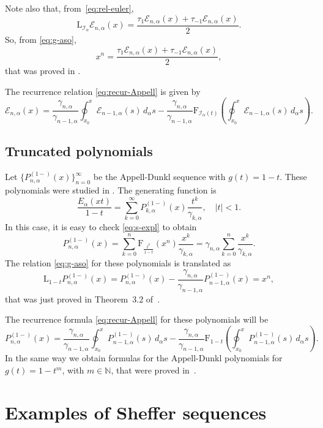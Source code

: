 \documentclass[11pt]{article}
\theoremstyle{plain}
\theoremstyle{remark}
\newtheorem{example}[theorem]{Example}
\numberwithin{equation}{section} %
\newcommand{\Ea}{E_{\alpha}}
\newcommand{\I}{\mathcal{I}}
\newcommand{\E}{\mathcal{E}}
\newcommand{\NN}{\mathbb{N}}
\newcommand{\FF}{\mathrm{F}}
\newcommand{\LL}{\mathrm{L}}
\begin{document}
Note also that, from~\eqref{eq:rel-euler},
\[
\LL_{\I_{\alpha}}\E_{n,\alpha}(x) = \frac{\tau_1\E_{n,\alpha}(x)+\tau_{-1}\E_{n,\alpha}(x)}{2}.
\]
So, from \eqref{eq:g-aso},
\[
x^n = \frac{\tau_1\E_{n,\alpha}(x)+\tau_{-1}\E_{n,\alpha}(x)}{2},
\]
that was proved in \cite{CMV}.

The recurrence relation \eqref{eq:recur-Appell} is given by
\[
\E_{n,\alpha}(x) = \frac{\gamma_{n,\alpha}}{\gamma_{n-1,\alpha}}
\oint_{x_0}^x \E_{n-1,\alpha}(s)\,d_{\alpha}s 
- \frac{\gamma_{n,\alpha}}{\gamma_{n-1,\alpha}} 
\FF_{\I_{\alpha}(t)} \left(\oint_{x_0}^x\E_{n-1,\alpha}(s)\,d_{\alpha}s\right).
\]

\subsection{Truncated polynomials}

Let $\{P_{n,\alpha}^{(1-)}(x)\}_{n=0}^{\infty}$ be the Appell-Dunkl sequence with $g(t) = 1-t$. These polynomials were studied in \cite{JMC}. The generating function is
\[
\frac{\Ea(xt)}{1-t} = \sum_{k=0}^{\infty}P_{k,\alpha}^{(1-)}(x)\frac{t^k}{\gamma_{k,\alpha}},\quad |t|<1.
\]
In this case, it is easy to check \eqref{eq:s-expl} to obtain
\[
P_{n,\alpha}^{(1-)}(x) = \sum_{k=0}^n 
\FF_{\frac{t^k}{1-t}}(x^n) \frac{x^k}{\gamma_{k,\alpha}} 
= \gamma_{n,\alpha} \sum_{k=0}^n \frac{x^k}{\gamma_{k,\alpha}}.
\]
The relation \eqref{eq:g-aso} for these polynomials is translated as 
\[
\LL_{1-t}P_{n,\alpha}^{(1-)}(x) = P_{n,\alpha}^{(1-)}(x)
- \frac{\gamma_{n,\alpha}}{\gamma_{n-1,\alpha}} P_{n-1,\alpha}^{(1-)}(x) = x^n,
\]
that was just proved in Theorem~3.2 of~\cite{JMC}.

The recurrence formula \eqref{eq:recur-Appell} for these polynomials will be
\[
P_{n,\alpha}^{(1-)}(x) 
= \frac{\gamma_{n,\alpha}}{\gamma_{n-1,\alpha}} 
\oint_{x_0}^x P_{n-1,\alpha}^{(1-)}(s)\,d_{\alpha}s
- \frac{\gamma_{n,\alpha}}{\gamma_{n-1,\alpha}} 
\FF_{1-t}\left(\oint_{x_0}^x P_{n-1,\alpha}^{(1-)}(s)\,d_{\alpha}s\right).
\]
In the same way we obtain formulas for the Appell-Dunkl polynomials for $g(t) = 1-t^m$, with $m \in \NN$, that were proved in~\cite{JMC}.

\section{Examples of Sheffer sequences}
\label{sec:ex-sheffer}
\end{document}
